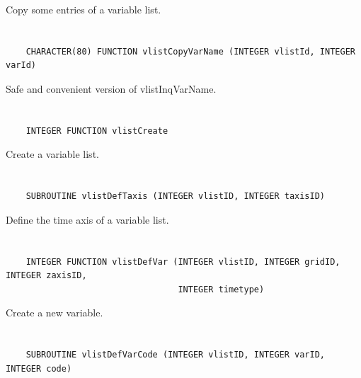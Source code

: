 Copy some entries of a variable list.


\section*{\tt {}}

\begin{verbatim}
    CHARACTER(80) FUNCTION vlistCopyVarName (INTEGER vlistId, INTEGER varId)
\end{verbatim}

Safe and convenient version of vlistInqVarName.


\section*{\tt {}}

\begin{verbatim}
    INTEGER FUNCTION vlistCreate
\end{verbatim}

Create a variable list.


\section*{\tt {}}

\begin{verbatim}
    SUBROUTINE vlistDefTaxis (INTEGER vlistID, INTEGER taxisID)
\end{verbatim}

Define the time axis of a variable list.


\section*{\tt {}}

\begin{verbatim}
    INTEGER FUNCTION vlistDefVar (INTEGER vlistID, INTEGER gridID, INTEGER zaxisID,
                                  INTEGER timetype)
\end{verbatim}

Create a new variable.


\section*{\tt {}}

\begin{verbatim}
    SUBROUTINE vlistDefVarCode (INTEGER vlistID, INTEGER varID, INTEGER code)
\end{verbatim}

